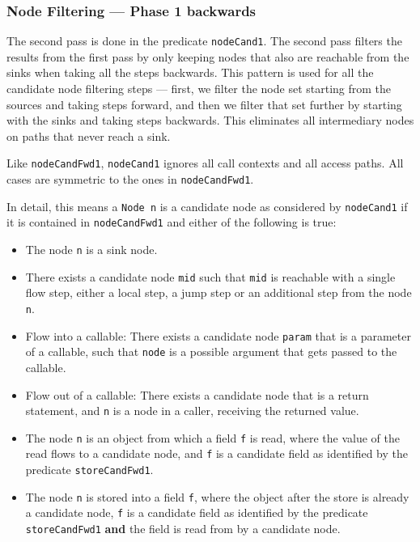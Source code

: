 \subsubsection*{Node Filtering --- Phase 1 backwards}
The second pass is done in the predicate \texttt{nodeCand1}.
The second pass filters the results from the first pass by only keeping nodes
that also are reachable from the sinks when taking all the steps backwards.
This pattern is used for all the candidate node filtering steps --- first, we 
filter the node set starting from the sources and taking steps forward,
and then we filter that set further by starting with the sinks and taking steps backwards.
This eliminates all intermediary nodes on paths that never reach a sink.

Like \texttt{nodeCandFwd1}, \texttt{nodeCand1} ignores all call contexts
and all access paths.
All cases are symmetric to the ones in \texttt{nodeCandFwd1}.

In detail, this means a \texttt{Node n} is a candidate node as considered by 
\texttt{nodeCand1} if it is contained in 
\texttt{nodeCandFwd1} and either of the following is true:
\begin{itemize}
    \item The node \texttt{n} is a sink node.
    \item There exists a candidate node \texttt{mid} such that \texttt{mid} is reachable with a single flow step,
    either a local step, a jump step or an additional step from the node \texttt{n}.
    \item Flow into a callable:
    There exists a candidate node \texttt{param} that is a parameter of a callable,
    such that \texttt{node} is a possible argument that gets passed to the callable.
    \item Flow out of a callable:
    There exists a candidate node that is a return statement, and \texttt{n} is 
    a node in a caller, receiving the returned value.
    \item The node \texttt{n} is an object from which a field \texttt{f} is read,
    where the value of the read flows to a candidate node, and \texttt{f}
    is a candidate field as identified by the predicate \texttt{storeCandFwd1}.
    \item The node \texttt{n} is stored into a field \texttt{f}, where the
    object after the store is already a candidate node, \texttt{f} is a
    candidate field as identified by the predicate \texttt{storeCandFwd1}
    \textbf{and} the field is read from by a candidate node.
\end{itemize}


